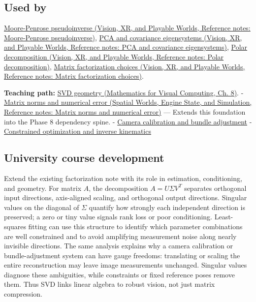 \subsection{Used by}\label{appendix-1fad5e7f36fa-used-by}

\hypertarget{appendix-1fad5e7f36fa-used-by}{}

\href{../07-Vision-XR-and-Playable-Worlds/main.pdf\#nameddest=appendix-541306fdbc1b}{Moore-Penrose pseudoinverse (Vision, XR, and Playable Worlds, Reference notes: Moore-Penrose pseudoinverse)}, \href{../07-Vision-XR-and-Playable-Worlds/main.pdf\#nameddest=appendix-ad175ef3c5bf}{PCA and covariance eigensystems (Vision, XR, and Playable Worlds, Reference notes: PCA and covariance eigensystems)}, \href{../07-Vision-XR-and-Playable-Worlds/main.pdf\#nameddest=appendix-73f5bcf7a462}{Polar decomposition (Vision, XR, and Playable Worlds, Reference notes: Polar decomposition)}, \href{../07-Vision-XR-and-Playable-Worlds/main.pdf\#nameddest=appendix-221a483bec2d}{Matrix factorization choices (Vision, XR, and Playable Worlds, Reference notes: Matrix factorization choices)}.

\textbf{Teaching path:} \href{../02-Mathematics-for-Visual-Computing/main.pdf\#nameddest=02-foundations-ii-ch024-singular-value-decomposition-covers-every-rectangular-map}{SVD geometry (Mathematics for Visual Computing, Ch. 8)}. - \href{../05-Spatial-Worlds-Engine-State-and-Simulation/main.pdf\#nameddest=appendix-f8657bac66e5}{Matrix norms and numerical error (Spatial Worlds, Engine State, and Simulation, Reference notes: Matrix norms and numerical error)} --- Extends this foundation into the Phase 8 dependency spine. - \hyperref[appendix-3ee9861904d5]{Camera calibration and bundle adjustment} - \hyperref[appendix-29f4bea4c2bb]{Constrained optimization and inverse kinematics}

\subsection{University course development}\label{appendix-1fad5e7f36fa-university-course-development}

\hypertarget{appendix-1fad5e7f36fa-university-course-development}{}

Extend the existing factorization note with its role in estimation, conditioning, and geometry. For matrix \(A\), the decomposition \(A=U\Sigma V^T\) separates orthogonal input directions, axis-aligned scaling, and orthogonal output directions. Singular values on the diagonal of \(\Sigma\) quantify how strongly each independent direction is preserved; a zero or tiny value signals rank loss or poor conditioning. Least-squares fitting can use this structure to identify which parameter combinations are well constrained and to avoid amplifying measurement noise along nearly invisible directions. The same analysis explains why a camera calibration or bundle-adjustment system can have gauge freedoms: translating or scaling the entire reconstruction may leave image measurements unchanged. Singular values diagnose these ambiguities, while constraints or fixed reference poses remove them. Thus SVD links linear algebra to robust vision, not just matrix compression.

